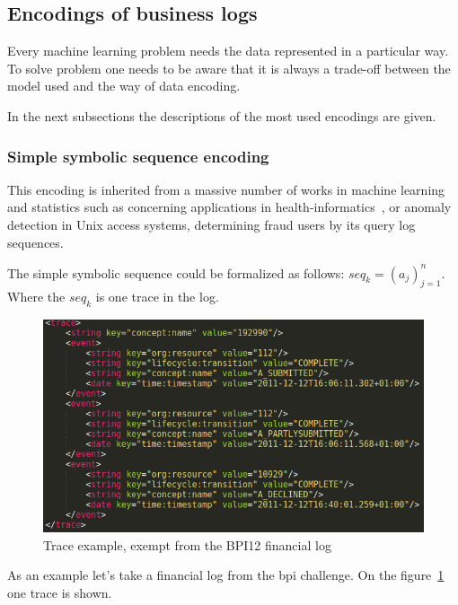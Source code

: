 \subsection{Encodings of business logs}

Every machine learning problem needs the data represented in a particular way. To solve problem one needs to be aware that it is always a trade-off between the model used and the way of data encoding. 

In the next subsections the descriptions of the most used encodings are given.


\subsubsection{Simple symbolic sequence encoding}

This encoding is inherited from a massive number of works in machine learning and statistics such as concerning applications in health-informatics~\cite{Xing:2010:BSS:1882471.1882478}, or anomaly detection in Unix access systems, determining fraud users by its query log sequences. 

The simple symbolic sequence could be formalized as follows: $seq_{k} = (a_j)_{j=1}^{n}$.
Where the $seq_{k}$ is one trace in the log.


\begin{figure}[!ht]
	\begin{center}  
		\includegraphics[width=\textwidth]{5_log_example_fin.png}
		\caption{Trace example, exempt from the BPI12 financial log~\cite{bpichallenge2012}}
		\label{figure:trace-example-2}	
	\end{center}
\end{figure}


As an example let's take a financial log from the bpi challenge. On the figure~\ref{figure:trace-example-2} one trace is shown.


